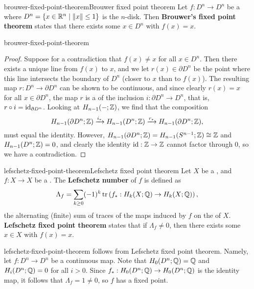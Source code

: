 \begin{topic}{brouwer-fixed-point-theorem}{Brouwer fixed point theorem}
    Let $f : D^n \to D^n$ be a  where $D^n = \{ x \in \mathbb{R}^n \mid \left\|x\right\| \le 1 \}$ is the $n$-disk. Then \textbf{Brouwer's fixed point theorem} states that there exists some $x \in D^n$ with $f(x) = x$.
\end{topic}

\begin{example}{brouwer-fixed-point-theorem}
    \begin{proof}
        Suppose for a contradiction that $f(x) \ne x$ for all $x \in D^n$. Then there exists a unique line from $f(x)$ to $x$, and we let $r(x) \in \partial D^n$ be the point where this line intersects the boundary of $D^n$ (closer to $x$ than to $f(x)$). The resulting map $r : D^n \to \partial D^n$ can be shown to be continuous, and since clearly $r(x) = x$ for all $x \in \partial D^n$, the map $r$ is a  of the inclusion $i : \partial D^n \to D^n$, that is, $r \circ i = \textup{id}_{\partial D^n}$. Looking at  $H_{n - 1}(-; \mathbb{Z})$, we find that the composition
        \[ H_{n - 1}(\partial D^n; \mathbb{Z}) \xrightarrow{i_*} H_{n - 1}(D^n; \mathbb{Z}) \xrightarrow{r_*} H_{n - 1}(\partial D^n; \mathbb{Z}) , \]
        must equal the identity. However, $H_{n - 1}(\partial D^n; \mathbb{Z}) = H_{n - 1}(S^{n - 1}; \mathbb{Z}) \cong \mathbb{Z}$ and $H_{n - 1}(D^n; \mathbb{Z}) = 0$, and clearly the identity $\textup{id} : \mathbb{Z} \to \mathbb{Z}$ cannot factor through $0$, so we have a contradiction.
    \end{proof}
\end{example}

\begin{topic}{lefschetz-fixed-point-theorem}{Lefschetz fixed point theorem}
    Let $X$ be a , and $f : X \to X$ be a . The \textbf{Lefschetz number} of $f$ is defined as
    \[ \Lambda_f = \sum_{k \ge 0} (-1)^k \operatorname{tr} \left(f_* : H_k(X; \mathbb{Q}) \to H_k(X; \mathbb{Q}) \right) , \]
    the alternating (finite) sum of traces of the maps induced by $f$ on the  of $X$. \textbf{Lefschetz fixed point theorem} states that if $\Lambda_f \ne 0$, then there exists some $x \in X$ with $f(x) = x$.
\end{topic}

\begin{example}{lefschetz-fixed-point-theorem}
     follows from Lefschetz fixed point theorem. Namely, let $f : D^n \to D^n$ be a continuous map. Note that $H_0(D^n; \mathbb{Q}) = \mathbb{Q}$ and $H_i(D^n; \mathbb{Q}) = 0$ for all $i > 0$. Since $f_* : H_0(D^n; \mathbb{Q}) \to H_0(D^n; \mathbb{Q})$ is the identity map, it follows that $\Lambda_f = 1 \ne 0$, so $f$ has a fixed point.
\end{example}

